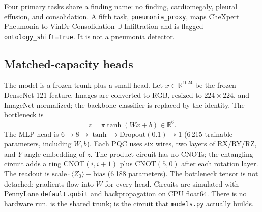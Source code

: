 \documentclass{midl} %
\begin{document}
Four primary tasks share a finding name: no finding, cardiomegaly, pleural effusion, and consolidation. A fifth task, \texttt{pneumonia\_proxy}, maps CheXpert Pneumonia to VinDr Consolidation $\cup$ Infiltration and is flagged \texttt{ontology\_shift=True}. It is not a pneumonia detector.

\subsection{Matched-capacity heads}

The model is a frozen trunk plus a small head. Let $x \in \mathbb{R}^{1024}$ be the frozen DenseNet-121 feature. Images are converted to RGB, resized to $224\times 224$, and ImageNet-normalized; the backbone classifier is replaced by the identity. The bottleneck is
\begin{equation}
\label{eq:bottleneck}
z = \pi \tanh(Wx + b) \in \mathbb{R}^{6}.
\end{equation}
The MLP head is $6 \to 8 \to \tanh \to \mathrm{Dropout}(0.1) \to 1$ (6\,215 trainable parameters, including $W,b$). Each PQC uses six wires, two layers of RX/RY/RZ, and $Y$-angle embedding of $z$. The product circuit has no CNOTs; the entangling circuit adds a ring $\mathrm{CNOT}(i,i+1)$ plus $\mathrm{CNOT}(5,0)$ after each rotation layer. The readout is $\mathrm{scale}\cdot\langle Z_0\rangle + \mathrm{bias}$ (6\,188 parameters). The bottleneck tensor is not detached: gradients flow into $W$ for every head. Circuits are simulated with PennyLane \texttt{default.qubit} and backpropagation on CPU float64. There is no hardware run.  is the shared trunk;  is the circuit that \texttt{models.py} actually builds.
\end{document}
